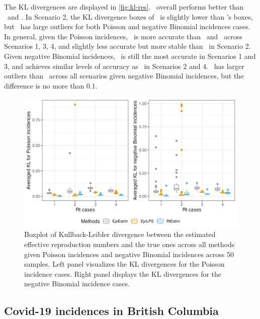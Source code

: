 The KL divergences are displayed in \autoref{fig:kl-res}. \RtEstim\ overall performs better than \EpiEstim\ and \EpiLPS. In Scenario 2, the KL divergence boxes of \EpiLPS\ is slightly lower than \RtEstim's boxes, but \EpiLPS\ has large outliers for both Poisson and negative Binomial incidences cases. In general, given the Poisson incidences, \RtEstim\ is more accurate than \EpiEstim\ and \EpiLPS\ across Scenarios 1, 3, 4, and slightly less accurate but more stable than \EpiLPS\ in Scenario 2. Given negative Binomial incidences, \RtEstim\ is still the most accurate in Scenarios 1 and 3, and achieves similar levels of accuracy as \EpiLPS\ in Scenarios 2 and 4. \RtEstim\ has larger outliers than \EpiLPS\ across all scenarios given negative Binomial incidences, but the difference is no more than $0.1$. 
\begin{figure}[htb]
    \centering
    \includegraphics*[width=160mm]{fig/kl.png}
    \caption{Boxplot of Kullback-Leibler divergence between the estimated effective reproduction numbers and the true ones across all methods given Poisson incidences and negative Binomial incidences across 50 samples. Left panel visualizes the KL divergences for the Poisson incidence cases. Right panel displays the KL divergences for the negative Binomial incidence cases.} 
    \label{fig:kl-res}
\end{figure}


\subsection{Covid-19 incidences in British Columbia}

